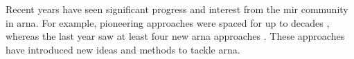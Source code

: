 

Recent years have seen significant progress and interest
from the \gls{mir} community in \gls{arna}. For example,
pioneering approaches were spaced for up to decades
\parencite{winograd1968linguistics, maxwell1984artificial,
temperley1997algorithm}, whereas the last year saw at least
four new \gls{arna} approaches \parencite{chen2021attend,
micchi2021deep, mcleod2021modular,
napoleslopez2021augmentednet}. These approaches have
introduced new ideas and methods to tackle \gls{arna}.
